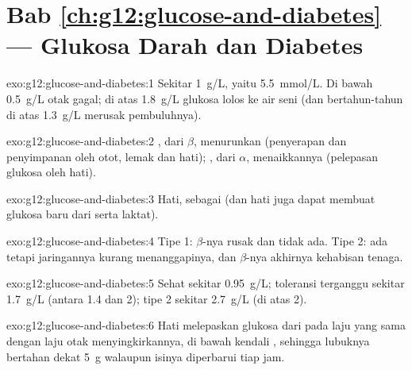\section*{Bab \ref{ch:g12:glucose-and-diabetes} --- Glukosa Darah dan Diabetes}

\begin{solution}{exo:g12:glucose-and-diabetes:1}
Sekitar \qty{1}{g/L}, yaitu \qty{5.5}{mmol/L}. Di bawah \qty{0.5}{g/L}
otak gagal; di atas \qty{1.8}{g/L} glukosa lolos ke air seni (dan
bertahun-tahun di atas \qty{1.3}{g/L} merusak pembuluhnya).
\end{solution}

\begin{solution}{exo:g12:glucose-and-diabetes:2}
, dari  $\beta$, menurunkan  (penyerapan dan
penyimpanan oleh otot, lemak dan hati); , dari  $\alpha$,
menaikkannya (pelepasan glukosa oleh hati).
\end{solution}

\begin{solution}{exo:g12:glucose-and-diabetes:3}
Hati, sebagai  (dan hati juga dapat membuat glukosa baru dari
 serta laktat).
\end{solution}

\begin{solution}{exo:g12:glucose-and-diabetes:4}
Tipe 1:  $\beta$-nya rusak dan  tidak ada. Tipe 2:
 ada tetapi jaringannya kurang menanggapinya, dan 
$\beta$-nya akhirnya kehabisan tenaga.
\end{solution}

\begin{solution}{exo:g12:glucose-and-diabetes:5}
Sehat sekitar \qty{0.95}{g/L}; toleransi terganggu sekitar \qty{1.7}{g/L}
(antara 1.4 dan 2); tipe 2 sekitar \qty{2.7}{g/L} (di atas 2).
\end{solution}

\begin{solution}{exo:g12:glucose-and-diabetes:6}
Hati melepaskan glukosa dari  pada laju yang sama dengan
laju otak menyingkirkannya, di bawah kendali , sehingga
lubuknya bertahan dekat \qty{5}{g} walaupun isinya diperbarui tiap jam.
\end{solution}

